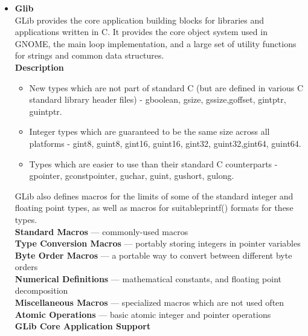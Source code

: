 \documentclass[12pt]{article}
\begin{document}
\newpage




\begin{itemize}

\item \textbf{Glib}\\
GLib provides the core application building blocks for libraries and applications written in C. It provides the core object system used in GNOME, the main loop implementation, and a large set of utility functions for strings and common data structures.\\

\textbf{Description}

\begin{itemize}
\item New types which are not part of standard C (but are defined in various C standard library header files) - gboolean, gsize, gssize,goffset, gintptr, guintptr.
\item Integer types which are guaranteed to be the same size across all platforms - gint8, guint8, gint16, guint16, gint32, guint32,gint64, guint64.
\item Types which are easier to use than their standard C counterparts - gpointer, gconstpointer, guchar, guint, gushort, gulong.



\end{itemize}

GLib also defines macros for the limits of some of the standard integer and floating point types, as well as macros for suitableprintf() formats for these types.\\


\textbf{Standard Macros} — commonly-used macros\\
\textbf{Type Conversion Macros} — portably storing integers in pointer variables\\
\textbf{Byte Order Macros} — a portable way to convert between different byte orders\\
\textbf{Numerical Definitions} — mathematical constants, and floating point decomposition\\
\textbf{Miscellaneous Macros} — specialized macros which are not used often\\
\textbf{Atomic Operations} — basic atomic integer and pointer operations\\

\textbf{GLib Core Application Support}
\begin{itemize}



\end{itemize}
\end{itemize}
\end{document}
